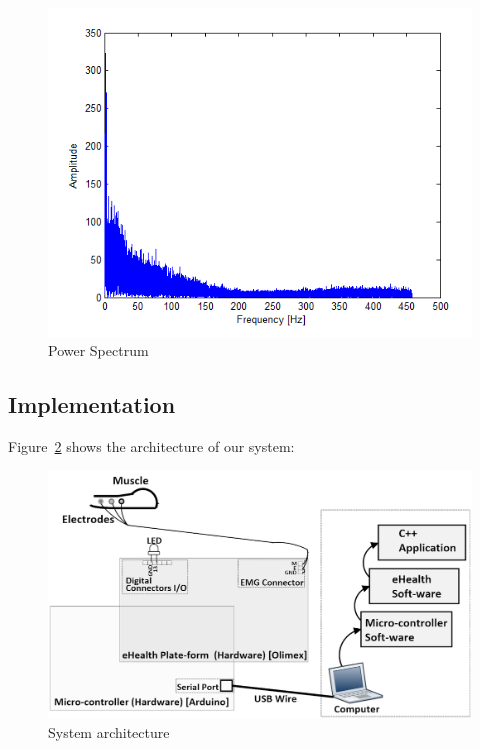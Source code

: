 \documentclass[conference]{IEEEtran}
\begin{document}
\begin{figure}
    \hspace*{1.2 cm}
    \includegraphics[scale=0.40]{fig4.png}
    \caption{Power Spectrum}
    \label{fig:spectre}
\end{figure}


\subsection{Implementation}\par

Figure~\ref{fig:architecture} shows the architecture of our system:

\begin{figure}[!hb]
    \includegraphics[scale=0.23]{architecture.png}
    \caption{System architecture}
    \label{fig:architecture}
\end{figure}
\end{document}
